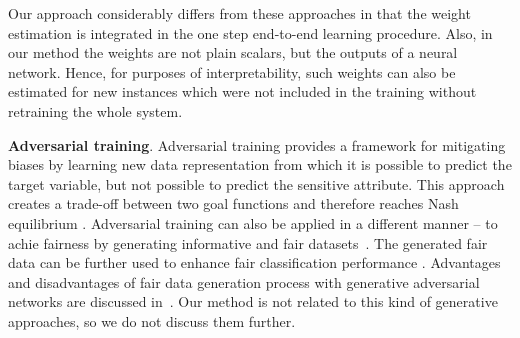 \documentclass[preprint,12pt]{elsarticle}
\begin{document}
Our approach considerably differs from these approaches in that the weight estimation is integrated in the one step end-to-end learning procedure. Also, in our method the weights are not plain scalars, but the outputs of a neural network. Hence, for purposes of interpretability, such weights can also be estimated for new instances which were not included in the training without retraining the whole system.

\textbf{Adversarial training}. Adversarial training provides a framework for mitigating biases by learning new data representation from which it is possible to predict the target variable, but not possible to predict the sensitive attribute. This approach creates a trade-off between two goal functions and therefore reaches Nash equilibrium \cite{goodfellow2014generative}. Adversarial training can also be applied in a different manner -- to achie fairness by generating informative and fair datasets~\cite{rajabi2021tabfairgan, choi2020fair}. The generated fair data can be further used to enhance fair classification performance \cite{jang2021constructing}. Advantages and disadvantages of fair data generation process with generative adversarial networks are discussed in~\cite{kenfack2021fairness}. Our method is not related to this kind of generative approaches, so we do not discuss them further.
\end{document}
